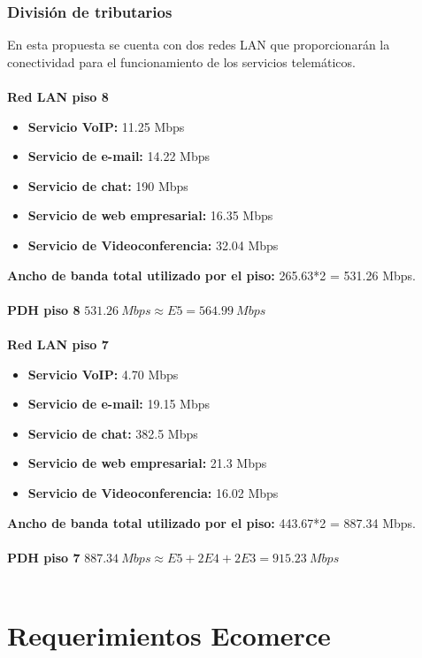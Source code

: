 \documentclass[12pt,letterpaper]{article}
\begin{document}
\subsubsection{División de tributarios}
En esta propuesta se cuenta con dos redes LAN que proporcionarán la conectividad para 
el funcionamiento de los servicios telemáticos.
\\ \\
\textbf{Red LAN piso 8}
\begin{itemize}
    \item \textbf{Servicio VoIP:} 11.25 Mbps
    \item \textbf{Servicio de e-mail: }14.22 Mbps
    \item \textbf{Servicio de chat: } 190 Mbps
    \item \textbf{Servicio de web empresarial: } 16.35 Mbps
    \item \textbf{Servicio de Videoconferencia: } 32.04 Mbps
\end{itemize}
\textbf{Ancho de banda total utilizado por el piso: }265.63*2 = 531.26 Mbps.
\\ \\
\textbf{PDH piso 8}
\newline
$531.26 \ Mbps \approx E5 = 564.99 \ Mbps$
\\ \\
\textbf{Red LAN piso 7}
\begin{itemize}
    \item \textbf{Servicio VoIP:} 4.70 Mbps
    \item \textbf{Servicio de e-mail: } 19.15 Mbps
    \item \textbf{Servicio de chat: } 382.5 Mbps
    \item \textbf{Servicio de web empresarial: } 21.3 Mbps
    \item \textbf{Servicio de Videoconferencia: } 16.02 Mbps
\end{itemize}
\textbf{Ancho de banda total utilizado por el piso: }443.67*2 = 887.34 Mbps.
\\ \\
\textbf{PDH piso 7}
\newline
$887.34 \ Mbps \approx E5 + 2E4+2E3 = 915.23 \ Mbps$
\\ \\


\newpage
\section{Requerimientos Ecomerce}
\end{document}
